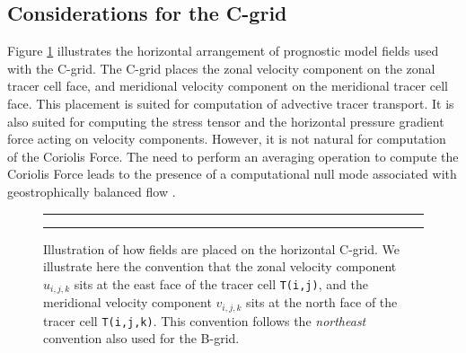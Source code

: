 \subsection{Considerations for the C-grid}
\label{subsection:c-grid-richardson-number}

Figure \ref{fig:c-grid} illustrates the horizontal arrangement of
prognostic model fields used with the C-grid. The C-grid places the
zonal velocity component on the zonal tracer cell face, and meridional
velocity component on the meridional tracer cell face.  This placement
is suited for computation of advective tracer transport.  It is also
suited for computing the stress tensor and the horizontal pressure
gradient force acting on velocity components.  However, it is not
natural for computation of the Coriolis Force.  The need to perform an
averaging operation to compute the Coriolis Force leads to the
presence of a computational null mode associated with geostrophically
balanced flow \citep{Adcroftetal1999}.

\begin{figure}
\rule{\textwidth}{0.005in}
\begin{center}
\caption[Placement of fields onto the C-grid] {Illustration of how
  fields are placed on the horizontal C-grid.  We illustrate here the
  convention that the zonal velocity component $u_{i,j,k}$ sits at the
  east face of the tracer cell {\tt T(i,j)}, and the meridional
  velocity component $v_{i,j,k}$ sits at the north face of the tracer
  cell {\tt T(i,j,k)}.  This convention follows the {\it northeast}
  convention also used for the B-grid.}
\label{fig:c-grid}
\end{center}
\rule{\textwidth}{0.005in}
\end{figure}


